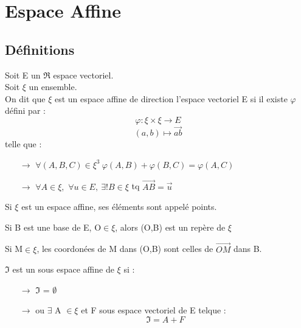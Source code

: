
\chapter{Espace Affine}
\section{Définitions}
\begin{de}
Soit E un $\Re$ espace vectoriel.\\
Soit $\xi$ un ensemble.\\
On dit que $\xi$ est un espace affine de direction l'espace vectoriel E si il existe $\varphi$ défini par : 
$$\varphi : \xi \times \xi \rightarrow E$$
$$(a,b) \mapsto \overrightarrow{ab}$$
telle que : 
\begin{itemize}
 \item[$\rightarrow$] $\forall(A,B,C)\in \xi^3~ \varphi(A,B)+\varphi(B,C) = \varphi(A,C)$
 \item[$\rightarrow$] $\forall A \in \xi,$ $\forall u \in E,~ \exists ! B \in \xi$ tq $\overrightarrow{AB}=\overrightarrow{u}$
\end{itemize}
\end{de}
\begin{voc}
Si $\xi$ est un espace affine, ses éléments sont appelé points.
\end{voc}
\begin{voc}
Si B est une base de E, O$\in \xi$, alors (O,B) est un repère de $\xi$
\end{voc}
\begin{voc}
Si M$\in \xi$, les coordonées de M dans (O,B) sont celles de $\overrightarrow{OM}$ dans B.
\end{voc}
\begin{prop}
$\Im$ est un sous espace affine de $\xi$ si :
\begin{itemize}
 \item[$\rightarrow$] $\Im$ = $\emptyset$
 \item[$\rightarrow$] ou $\exists$ A $\in \xi$ et F sous espace vectoriel de E telque : $$\Im = A + F$$
\end{itemize}
\end{prop}
